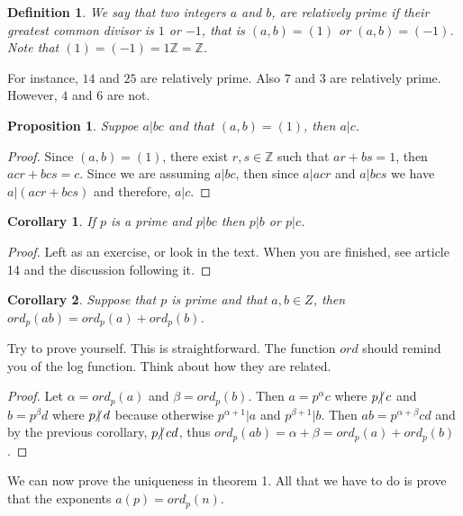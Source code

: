 \documentclass{article}
\theoremstyle{problemstyle}
\newtheorem{proposition}{Proposition}
\newtheorem{corollary}{Corollary}
\newtheorem{definition}{Definition}
\newcommand{\ndiv}{\hspace{-4pt}\not|\hspace{2pt}}
\begin{document}
\begin{definition}
We say that two integers $a$ and $b$, are relatively prime if their greatest common divisor is $1$ or $-1$, that is $(a,b) = (1)$ or $(a,b) = (-1)$. Note that $(1) = (-1) = 1\mathbb{Z} = \mathbb{Z}$. 
\end{definition}

For instance, $14$ and $25$ are relatively prime. Also $7$ and $3$ are relatively prime. However, $4$ and $6$ are not. 

\begin{proposition}
Suppoe $a|bc$ and that $(a,b) = (1)$, then $a|c$. 
\end{proposition}

\begin{proof}
Since $(a,b) = (1)$, there exist $r,s \in \mathbb{Z}$ such that $ar + bs = 1$, then $acr + bcs = c$. Since we are assuming $a|bc$, then since $a|acr$ and $a|bcs$ we have $a|(acr + bcs)$ and therefore, $a|c$. 
\end{proof}

\begin{corollary}
If $p$ is a prime and $p|bc$ then $p|b$ or $p|c$. 
\end{corollary}

\begin{proof}
Left as an exercise, or look in the text. When you are finished, see article 14 and the discussion following it.  
\end{proof}

\begin{corollary}
Suppose that $p$ is prime and that $a,b \in Z$, then $ord_p(ab) = ord_p(a) + ord_p(b)$. 
\end{corollary}

Try to prove yourself. This is straightforward. The function $ord$ should remind you of the log function. Think about how they are related. 

\begin{proof}
Let $\alpha = ord_p(a)$ and $\beta = ord_p(b)$. Then $a = p^{\alpha}c$ where $p\ndiv c$ and $b = p^{\beta}d$ where $p \ndiv d$ because otherwise $p^{\alpha+1}|a$ and $p^{\beta+1}|b$. Then $ab = p^{\alpha+\beta}cd$ and by the previous corollary, $p\ndiv cd$, thus $ord_p(ab) = \alpha+\beta = ord_p(a) + ord_p(b)$. 
\end{proof}

We can now prove the uniqueness in theorem 1. All that we have to do is prove that the exponents $a(p) = ord_p(n)$. 
\end{document}
